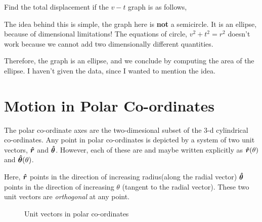 \begin{example}
    Find the total displacement if the \(v-t\) graph is as follows,
    \begin{figure}
        [H]
        \centering
    \end{figure}
    The idea behind this is simple, the graph here is \textbf{not} a semicircle. It is an
    ellipse, because of dimensional limitations! The equations of circle, \(v^2 + t^2 = r^2\)
    doesn't work because we cannot add two dimensionally different quantities.

    Therefore, the graph is an ellipse, and we conclude by computing the area of the ellipse. I haven't
    given the data, since I wanted to mention the idea.
\end{example}

\section{Motion in Polar Co-ordinates}

The polar co-ordinate axes are the two-dimesional subset of the 3-d cylindrical co-ordinates. 
Any point in polar co-ordinates is depicted by a system of two unit vectors, \({{\boldsymbol{\hat{r}}}}\) and
\({{\boldsymbol{\hat{\theta}}}}\). However, each of these are  and
maybe written explicitly as \({{\boldsymbol{\hat{r}}}}(\theta)\) and \({{\boldsymbol{\hat{\theta}}}}(\theta)\).  

Here, \({{\boldsymbol{\hat{r}}}}\) points in the direction of increasing radius(along the radial vector)
\({{\boldsymbol{\hat{\theta}}}}\) points in the direction of increasing \(\theta\) (tangent to the radial vector).
These two unit vectors are \emph{orthogonal} at any point. 

\begin{figure}
    [H]
    \centering
    \caption{Unit vectors in polar co-ordinates}
    \label{fig: polarunit}
\end{figure}

